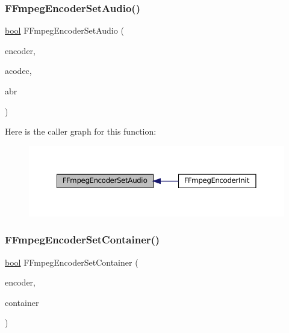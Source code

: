 \subsubsection{\texorpdfstring{F\+Fmpeg\+Encoder\+Set\+Audio()}{FFmpegEncoderSetAudio()}}
{\footnotesize\ttfamily \mbox{\hyperlink{libretro_8h_a4a26dcae73fb7e1528214a068aca317e}{bool}} F\+Fmpeg\+Encoder\+Set\+Audio (\begin{DoxyParamCaption}\item[{struct \mbox{\hyperlink{ffmpeg-encoder_8h_struct_f_fmpeg_encoder}{F\+Fmpeg\+Encoder}} $\ast$}]{encoder,  }\item[{const char $\ast$}]{acodec,  }\item[{unsigned}]{abr }\end{DoxyParamCaption})}

Here is the caller graph for this function\+:
\nopagebreak
\begin{figure}[H]
\begin{center}
\leavevmode
\includegraphics[width=350pt]{ffmpeg-encoder_8c_a2c0ebf9db7aa98077c9c0b128b329c28_icgraph}
\end{center}
\end{figure}
\mbox{\label{ffmpeg-encoder_8c_abad277264801a7f376d166746514d683}} 
\subsubsection{\texorpdfstring{F\+Fmpeg\+Encoder\+Set\+Container()}{FFmpegEncoderSetContainer()}}
{\footnotesize\ttfamily \mbox{\hyperlink{libretro_8h_a4a26dcae73fb7e1528214a068aca317e}{bool}} F\+Fmpeg\+Encoder\+Set\+Container (\begin{DoxyParamCaption}\item[{struct \mbox{\hyperlink{ffmpeg-encoder_8h_struct_f_fmpeg_encoder}{F\+Fmpeg\+Encoder}} $\ast$}]{encoder,  }\item[{const char $\ast$}]{container }\end{DoxyParamCaption})}

